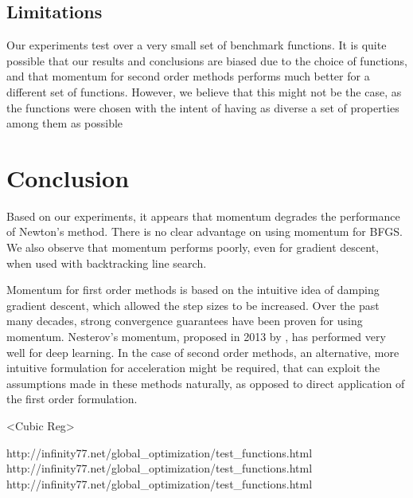 \documentclass{article}
\begin{document}
\subsection{Limitations}
Our experiments test over a very small set of benchmark functions. It is quite possible that our results and conclusions are biased due to the choice of functions, and that momentum for second order methods performs much better for a different set of functions. However, we believe that this might not be the case, as the functions were chosen with the intent of having as diverse a set of properties among them as possible


\section{Conclusion}\label{conclusion}
Based on our experiments, it appears that momentum degrades the performance of Newton's method. There is no clear advantage on using momentum for BFGS. We also observe that momentum performs poorly, even for gradient descent, when used with backtracking line search.

Momentum for first order methods is based on the intuitive idea of damping gradient descent, which allowed the step sizes to be increased. Over the past many decades, strong convergence guarantees have been proven for using momentum. Nesterov's momentum, proposed in 2013 by \citet{Sutskever}, has performed very well for deep learning. In the case of second order methods, an alternative, more intuitive formulation for acceleration might be required, that can exploit the assumptions made in these methods naturally, as opposed to direct application of the first order formulation.

<Cubic Reg>

http://infinity77.net/global\_optimization/test\_functions.html
http://infinity77.net/global\_optimization/test\_functions.html
http://infinity77.net/global\_optimization/test\_functions.html


\end{document}
